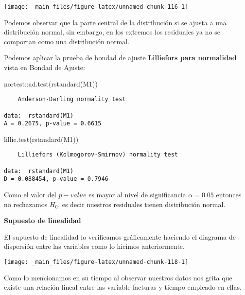 \documentclass[
  a4paper,
  oneside,
  openany]{book}
\newenvironment{Shaded}{\begin{snugshade}}{\end{snugshade}}
\newcommand{\FunctionTok}[1]{\textcolor[rgb]{0.00,0.00,0.00}{#1}}
\newcommand{\NormalTok}[1]{#1}
\newcommand{\SpecialCharTok}[1]{\textcolor[rgb]{0.00,0.00,0.00}{#1}}
\begin{document}
\begin{center}\texttt{[image: \_main\_files/figure-latex/unnamed-chunk-116-1]} \end{center}

Podemos observar que la parte central de la distribución si se ajusta a una distribución normal, sin embargo, en los extremos los residuales ya no se comportan como una distribución normal.

Podemos aplicar la prueba de bondad de ajuste \textbf{Lilliefors para normalidad} vista en Bondad de Ajuste:

\begin{Shaded}
\begin{Highlighting}[]
\NormalTok{nortest}\SpecialCharTok{::}\FunctionTok{ad.test}\NormalTok{(}\FunctionTok{rstandard}\NormalTok{(M1))}
\end{Highlighting}
\end{Shaded}

\begin{verbatim}
    Anderson-Darling normality test

data:  rstandard(M1)
A = 0.2675, p-value = 0.6615
\end{verbatim}

\begin{Shaded}
\begin{Highlighting}[]
\FunctionTok{lillie.test}\NormalTok{(}\FunctionTok{rstandard}\NormalTok{(M1))}
\end{Highlighting}
\end{Shaded}

\begin{verbatim}
    Lilliefors (Kolmogorov-Smirnov) normality test

data:  rstandard(M1)
D = 0.088454, p-value = 0.7946
\end{verbatim}

Como el valor del \(p-value\) es mayor al nivel de significancia \(\alpha=0.05\) entonces no rechazamos \(H_{0}\), es decir nuestros residuales tienen distribución normal.

\textbf{Supuesto de linealidad}

El supuesto de linealidad lo verificamos gráficamente haciendo el diagrama de dispersión entre las variables como lo hicimos anteriormente.

\begin{center}\texttt{[image: \_main\_files/figure-latex/unnamed-chunk-118-1]} \end{center}

Como lo mencionamos en su tiempo al observar nuestros datos nos grita que existe una relación lineal entre las variable facturas y tiempo empleado en ellas.
\end{document}

